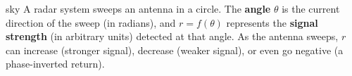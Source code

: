 \documentclass[10pt]{article}
\begin{document}
\namepartnerperiod

\vspace{0.10in}

\begin{scenariobox}{sky}
A radar system sweeps an antenna in a circle. The \textbf{angle} $\theta$ is the
current direction of the sweep (in radians), and $r = f(\theta)$ represents the
\textbf{signal strength} (in arbitrary units) detected at that angle. As the antenna
sweeps, $r$ can increase (stronger signal), decrease (weaker signal), or even
go negative (a phase-inverted return).
\end{scenariobox}

\vspace{0.08in}
\end{document}
